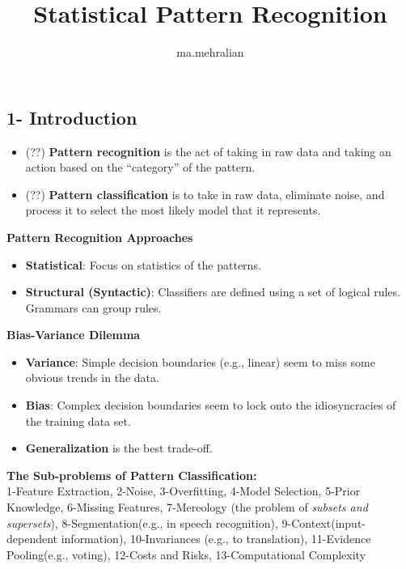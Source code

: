 \documentclass{../cheat}
\title{Statistical Pattern Recognition}
\author{ma.mehralian}
\begin{document}
\begin{multicols}{3}

	\section{1- Introduction}
		\begin{itemize}[nolistsep, leftmargin=1em]
			\item (??) \textbf{Pattern recognition} is the act of taking in raw data and taking an action based on the “category” of the pattern.
			\item (??) \textbf{Pattern classification} is to take in raw data, eliminate noise, and process it to select the most likely model that it represents.
		\end{itemize}
	
		\textbf{Pattern Recognition Approaches}
		\begin{itemize}[nolistsep, leftmargin=1em]
			\item \textbf{Statistical}: Focus on statistics of the patterns.
			\item \textbf{Structural (Syntactic)}: Classifiers are defined using a set of logical rules. Grammars can group rules.
		\end{itemize}
		
		\textbf{Bias-Variance Dilemma}
		\begin{itemize}[nolistsep, leftmargin=1em]
			\item \textbf{Variance}: Simple decision boundaries (e.g., linear) seem to miss some obvious trends in the data.
			\item \textbf{Bias}: Complex decision boundaries seem to lock onto the idiosyncracies of the training data set.
			\item \textbf{Generalization} is the best trade-off.
		\end{itemize}
		\textbf{The Sub-problems of Pattern Classification:}\\ 1-Feature Extraction, 2-Noise, 3-Overfitting, 4-Model Selection, 5-Prior Knowledge, 6-Missing Features, 7-Mereology (the problem of \textit{subsets and supersets}), 8-Segmentation(e.g., in speech recognition), 9-Context(input-dependent information), 10-Invariances (e.g., to translation), 11-Evidence Pooling(e.g., voting), 12-Costs and Risks, 13-Computational Complexity
			

\end{multicols}
\end{document}

